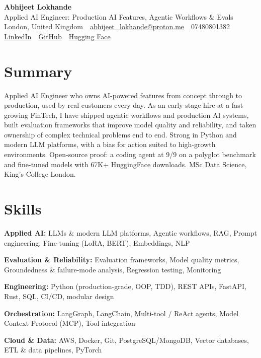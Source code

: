 \documentclass[10pt,a4paper]{article}
\newcommand{\sep}{\,\textcolor{accent!60}{\textbar}\,}
\begin{document}
\begin{center}
  {\fontsize{24}{26}\selectfont\bfseries Abhijeet Lokhande}\\[3pt]
  {\color{accent}\large Applied AI Engineer: Production AI Features, Agentic Workflows \& Evals}\\[5pt]
  {\small
    London, United Kingdom \sep
    \href{mailto:abhijeet_lokhande@proton.me}{abhijeet\_lokhande@proton.me} \sep
    07480801382 \\[2pt]
    \href{https://www.linkedin.com/in/ablds/}{LinkedIn} \sep
    \href{https://github.com/abhijeetscode}{GitHub} \sep
    \href{https://huggingface.co/ab-ai}{Hugging Face}
  }
\end{center}
\vspace{2pt}

\section{Summary}
Applied AI Engineer who owns AI-powered features from concept through to production, used by real customers every day. As an early-stage hire at a fast-growing FinTech, I have shipped agentic workflows and production AI systems, built evaluation frameworks that improve model quality and reliability, and taken ownership of complex technical problems end to end. Strong in Python and modern LLM platforms, with a bias for action suited to high-growth environments. Open-source proof: a coding agent at 9/9 on a polyglot benchmark and fine-tuned models with 67K+ HuggingFace downloads. MSc Data Science, King's College London.

\section{Skills}
\begin{tight}
  \item[\textcolor{accent}{\small$\bullet$}] \textbf{Applied AI:} LLMs \& modern LLM platforms, Agentic workflows, RAG, Prompt engineering, Fine-tuning (LoRA, BERT), Embeddings, NLP
  \item[\textcolor{accent}{\small$\bullet$}] \textbf{Evaluation \& Reliability:} Evaluation frameworks, Model quality metrics, Groundedness \& failure-mode analysis, Regression testing, Monitoring
  \item[\textcolor{accent}{\small$\bullet$}] \textbf{Engineering:} Python (production-grade, OOP, TDD), REST APIs, FastAPI, Rust, SQL, CI/CD, modular design
  \item[\textcolor{accent}{\small$\bullet$}] \textbf{Orchestration:} LangGraph, LangChain, Multi-tool / ReAct agents, Model Context Protocol (MCP), Tool integration
  \item[\textcolor{accent}{\small$\bullet$}] \textbf{Cloud \& Data:} AWS, Docker, Git, PostgreSQL/MongoDB, Vector databases, ETL \& data pipelines, PyTorch
\end{tight}
\end{document}
